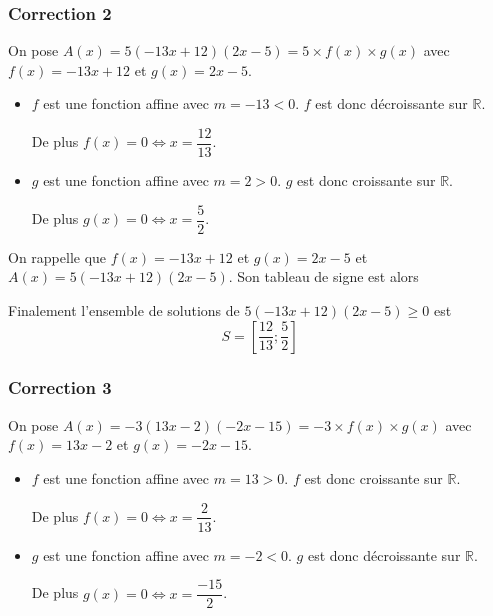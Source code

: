 \documentclass[15pt, mathserif]{beamer}
\begin{document}
\begin{frame}
\vspace{-10mm}
	\frametitle{Correction 2}
On pose $A(x) = 5(-13x+12)(2x-5) = 5\times f(x) \times g(x)$ avec $f(x) = -13x+12$ et $g(x) = 2x-5$.

\begin{itemize}
	\item $f$ est une fonction affine avec $m =-13<0$. $f$ est donc décroissante sur $\mathbb{R}$.

	 De plus $f(x) = 0 \Leftrightarrow x = \dfrac{12}{13}$.
	\item $g$ est une fonction affine avec $m =2>0$. $g$ est donc croissante sur $\mathbb{R}$.

	 De plus $g(x) = 0 \Leftrightarrow x = \dfrac{5}{2}$.
\end{itemize}

 \end{frame}


\begin{frame}On rappelle que $f(x) = -13x+12$ et $g(x) = 2x-5$ et $A(x) = 5(-13x+12)(2x-5)$. Son tableau de signe est alors 

\medskip \hfil
{}

 Finalement l'ensemble de solutions de $5(-13x+12)(2x-5)\geq0$ est\[S = \left[\dfrac{12}{13};\dfrac{5}{2}\right]\]

\end{frame}


\begin{frame}
\vspace{-10mm}
	\frametitle{Correction 3}
On pose $A(x) = -3(13x-2)(-2x-15) = -3\times f(x) \times g(x)$ avec $f(x) = 13x-2$ et $g(x) = -2x-15$.

\begin{itemize}
	\item $f$ est une fonction affine avec $m =13>0$. $f$ est donc croissante sur $\mathbb{R}$.

	 De plus $f(x) = 0 \Leftrightarrow x = \dfrac{2}{13}$.
	\item $g$ est une fonction affine avec $m =-2<0$. $g$ est donc décroissante sur $\mathbb{R}$.

	 De plus $g(x) = 0 \Leftrightarrow x = \dfrac{-15}{2}$.
\end{itemize}

 \end{frame}
\end{document}
